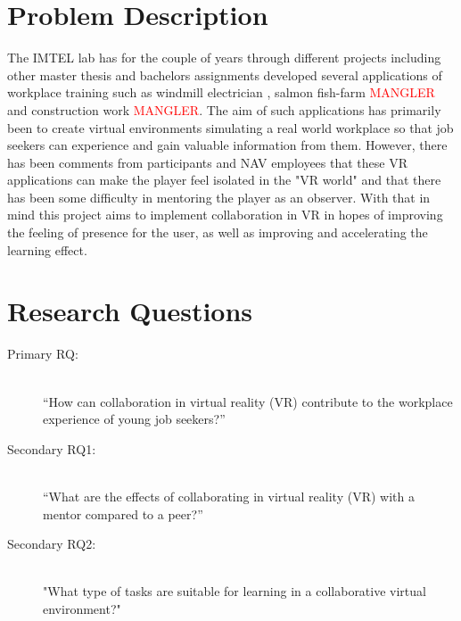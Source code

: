 



%

\section{Problem Description}
The IMTEL lab has for the couple of years through different projects including other master thesis and bachelors assignments developed several applications of workplace training such as windmill electrician \cite{henrichsen2019engaging}, salmon fish-farm \cite{} \textcolor{red}{MANGLER} and construction work \cite{}  \textcolor{red}{MANGLER}. The aim of such applications has primarily been to create virtual environments simulating a real world workplace so that job seekers can experience and gain valuable information from them.
However, there has been comments from participants and NAV employees that these VR applications can make the player feel isolated in the "VR world" and that there has been some difficulty in mentoring the player as an observer. With that in mind this project aims to implement collaboration in VR in hopes of improving the feeling of presence for the user, as well as improving and accelerating the learning effect. 


\section{Research Questions}
\label{RQ}
\begin{description}
    \item [Primary RQ:]\hfill \\
    “How can collaboration in virtual reality (VR) contribute to the workplace experience of young job seekers?” 
    \item [Secondary RQ1:]\hfill \\
    “What are the effects of collaborating in virtual reality (VR) with a mentor compared to a peer?”
    \item [Secondary RQ2:]\hfill \\
    "What type of tasks are suitable for learning in a collaborative virtual environment?"
\end{description}


\cleardoublepage
